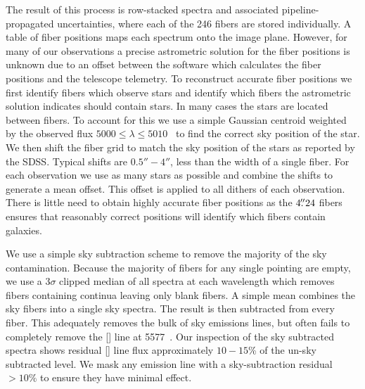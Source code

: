 The result of this process is row-stacked spectra and associated pipeline-propagated uncertainties, where each of the 246 fibers are stored individually. A table of fiber positions maps each spectrum onto the image plane. However, for many of our observations a precise astrometric solution for the fiber positions is unknown due to an offset between the software which calculates the fiber positions and the telescope telemetry. To reconstruct accurate fiber positions we first identify fibers which observe stars and identify which fibers the astrometric solution indicates should contain stars. In many cases the stars are located between fibers. To account for this we use a simple Gaussian centroid weighted by the observed flux $5000 \leq \lambda \leq 5010$ \AAA\ to find the correct sky position of the star. We then shift the fiber grid to match the sky position of the stars as reported by the SDSS. Typical shifts are $0.5'' - 4''$, less than the width of a single fiber. For each observation we use as many stars as possible and combine the shifts to generate a mean offset. This offset is applied to all dithers of each observation. There is little need to obtain highly accurate fiber positions as the $4\mbox{\ensuremath{.\!\!^{\prime\prime}}}24$ fibers ensures that reasonably correct positions will identify which fibers contain galaxies.

We use a simple sky subtraction scheme to remove the majority of the sky contamination. Because the majority of fibers for any single pointing are empty, we use a $3\sigma$ clipped median of all spectra at each wavelength which removes fibers containing continua leaving only blank fibers. A simple mean combines the sky fibers into a single sky spectra. The result is then subtracted from every fiber. This adequately removes the bulk of sky emissions lines, but often fails to completely remove the [] line at 5577~\AAA. Our inspection of the sky subtracted spectra shows residual [] line flux approximately $10-15$\% of the un-sky subtracted level. We mask any emission line with a sky-subtraction residual $>10\%$ to ensure they have minimal effect.

